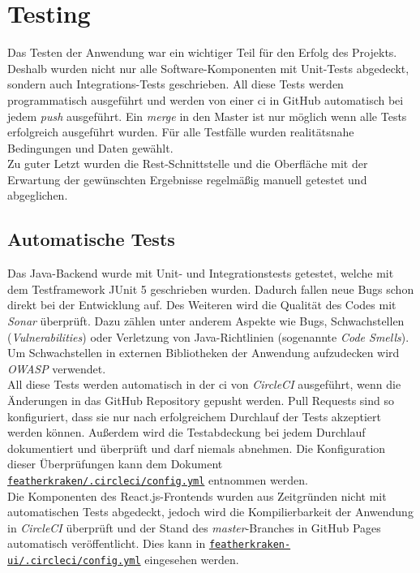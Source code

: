 \documentclass[12pt,twoside,a4paper]{article}
\begin{document}
\begin{sloppypar}
\section{Testing}
Das Testen der Anwendung war ein wichtiger Teil für den Erfolg des Projekts. Deshalb wurden nicht nur alle Software-Komponenten mit Unit-Tests abgedeckt, sondern auch Integrations-Tests geschrieben. All diese Tests werden programmatisch ausgeführt und werden von einer \acrshort{ci} in GitHub automatisch bei jedem \textit{push} ausgeführt. Ein \textit{merge} in den Master ist nur möglich wenn alle Tests erfolgreich ausgeführt wurden. Für alle Testfälle wurden realitätsnahe Bedingungen und Daten gewählt.\\
Zu guter Letzt wurden die Rest-Schnittstelle und die Oberfläche mit der Erwartung der gewünschten Ergebnisse regelmäßig manuell getestet und abgeglichen.
\subsection{Automatische Tests}
Das Java-Backend wurde mit Unit- und Integrationstests getestet, welche mit dem Testframework JUnit 5 geschrieben wurden. Dadurch fallen neue Bugs schon direkt bei der Entwicklung auf. Des Weiteren wird die Qualität des Codes mit \textit{Sonar} überprüft. Dazu zählen unter anderem Aspekte wie Bugs, Schwachstellen (\textit{Vulnerabilities}) oder Verletzung von Java-Richtlinien (sogenannte \textit{Code Smells}). Um Schwachstellen in externen Bibliotheken der Anwendung aufzudecken wird \textit{OWASP} verwendet.\\
All diese Tests werden automatisch in der \acrfull{ci} von \textit{CircleCI} ausgeführt, wenn die Änderungen in das GitHub Repository gepusht werden. Pull Requests sind so konfiguriert, dass sie nur nach erfolgreichem Durchlauf der Tests akzeptiert werden können. Außerdem wird die Testabdeckung bei jedem Durchlauf dokumentiert und überprüft und darf niemals abnehmen. Die Konfiguration dieser Überprüfungen kann dem Dokument \href{https://github.com/featherkraken/featherkraken/blob/master/.circleci/config.yml}{\texttt{featherkraken/.circleci/config.yml}} entnommen werden.\\
Die Komponenten des React.js-Frontends wurden aus Zeitgründen nicht mit automatischen Tests abgedeckt, jedoch wird die Kompilierbarkeit der Anwendung in \textit{CircleCI} überprüft und der Stand des \textit{master}-Branches in GitHub Pages automatisch veröffentlicht. Dies kann in \href{https://github.com/featherkraken/featherkraken-ui/blob/master/.circleci/config.yml}{\texttt{featherkraken-ui/.circleci/config.yml}} eingesehen werden.

\end{sloppypar}
\end{document}
